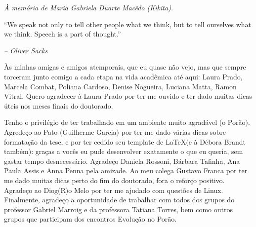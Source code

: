 \newpage

\vspace*{0.75\textheight}
\begin{flushright}
  \emph{À memória de Maria Gabriela Duarte Macêdo (Kikita).}
\end{flushright}

\newpage


\vspace*{0.7\textheight}
“We speak not only to tell other people what we think, but to tell ourselves what we think. Speech is a part of thought.” 

\emph{-- Oliver Sacks}

\newpage




\medskip

Às minhas amigas e amigos atemporais, que eu quase não vejo, mas que sempre torceram junto comigo a cada etapa na vida acadêmica até aqui: Laura Prado, Marcela Combat, Poliana Cardoso, Denise Nogueira, Luciana Matta, Ramon Vitral. Quero agradecer à Laura Prado por ter me ouvido e ter dado muitas dicas úteis nos meses finais do doutorado.

Tenho o privilégio de ter trabalhado em um ambiente muito agradável (o Porão). Agredeço ao Pato (Guilherme Garcia) por ter me dado várias dicas sobre formatação da tese, e por ter cedido seu template de \LaTeX (e à Débora Brandt também): graças a vocês eu pude desenvolver exatamente o que eu queria, sem gastar tempo desnecessário. Agradeço Daniela Rossoni, Bárbara Tafinha, Ana Paula Assis e Anna Penna pela amizade. Ao meu colega Gustavo Franca por ter me dado muitas dicas perto do fim do doutorado, fora o reforço positivo. Agradeço ao Diog(R)o Melo por ter me ajudado com questões de Linux. Finalmente, agradeço a oportunidade de trabalhar com todos dos grupos do professor Gabriel Marroig e da professora Tatiana Torres, bem como outros grupos que participam dos encontros Evolução no Porão.
     
